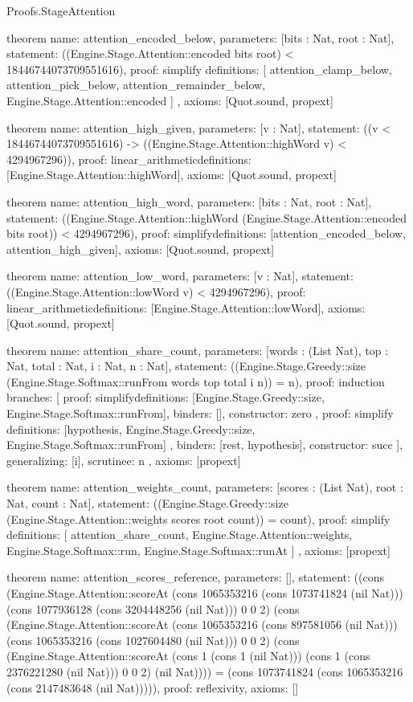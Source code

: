 \begin{lexlean}{Proofs.StageAttention}
\begin{semanticmodule}
theorem{
  name: attention_encoded_below,
  parameters: [bits : Nat, root : Nat],
  statement: ((Engine.Stage.Attention::encoded bits root) < 18446744073709551616),
  proof: simplify{
    definitions: [
      attention_clamp_below,
      attention_pick_below,
      attention_remainder_below,
      Engine.Stage.Attention::encoded
    ]
  },
  axioms: [Quot.sound, propext]
}

theorem{
  name: attention_high_given,
  parameters: [v : Nat],
  statement: ((v < 18446744073709551616) -> ((Engine.Stage.Attention::highWord v) < 4294967296)),
  proof: linear_arithmetic{definitions: [Engine.Stage.Attention::highWord]},
  axioms: [Quot.sound, propext]
}

theorem{
  name: attention_high_word,
  parameters: [bits : Nat, root : Nat],
  statement: ((Engine.Stage.Attention::highWord (Engine.Stage.Attention::encoded bits root)) < 4294967296),
  proof: simplify{definitions: [attention_encoded_below, attention_high_given]},
  axioms: [Quot.sound, propext]
}

theorem{
  name: attention_low_word,
  parameters: [v : Nat],
  statement: ((Engine.Stage.Attention::lowWord v) < 4294967296),
  proof: linear_arithmetic{definitions: [Engine.Stage.Attention::lowWord]},
  axioms: [Quot.sound, propext]
}

theorem{
  name: attention_share_count,
  parameters: [words : (List Nat), top : Nat, total : Nat, i : Nat, n : Nat],
  statement: ((Engine.Stage.Greedy::size (Engine.Stage.Softmax::runFrom words top total i n)) = n),
  proof: induction{
    branches: [
      {
        proof: simplify{definitions: [Engine.Stage.Greedy::size, Engine.Stage.Softmax::runFrom]},
        binders: [],
        constructor: zero
      },
      {
        proof: simplify{
          definitions: [hypothesis, Engine.Stage.Greedy::size, Engine.Stage.Softmax::runFrom]
        },
        binders: [rest, hypothesis],
        constructor: succ
      }
    ],
    generalizing: [i],
    scrutinee: n
  },
  axioms: [propext]
}

theorem{
  name: attention_weights_count,
  parameters: [scores : (List Nat), root : Nat, count : Nat],
  statement: ((Engine.Stage.Greedy::size (Engine.Stage.Attention::weights scores root count)) = count),
  proof: simplify{
    definitions: [
      attention_share_count,
      Engine.Stage.Attention::weights,
      Engine.Stage.Softmax::run,
      Engine.Stage.Softmax::runAt
    ]
  },
  axioms: [propext]
}

theorem{
  name: attention_scores_reference,
  parameters: [],
  statement: ((cons (Engine.Stage.Attention::scoreAt (cons 1065353216 (cons 1073741824 (nil Nat))) (cons 1077936128 (cons 3204448256 (nil Nat))) 0 0 2) (cons (Engine.Stage.Attention::scoreAt (cons 1065353216 (cons 897581056 (nil Nat))) (cons 1065353216 (cons 1027604480 (nil Nat))) 0 0 2) (cons (Engine.Stage.Attention::scoreAt (cons 1 (cons 1 (nil Nat))) (cons 1 (cons 2376221280 (nil Nat))) 0 0 2) (nil Nat)))) = (cons 1073741824 (cons 1065353216 (cons 2147483648 (nil Nat))))),
  proof: reflexivity{},
  axioms: []
}


\end{semanticmodule}
\end{lexlean}
